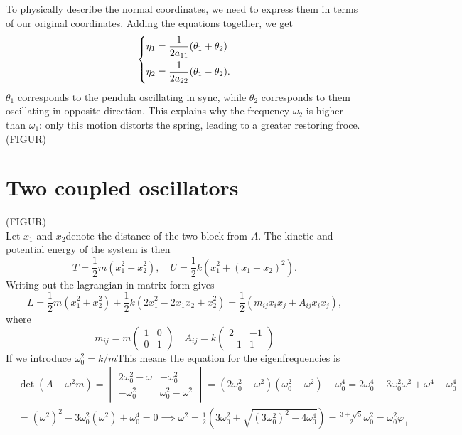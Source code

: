 \documentclass{article}
\begin{document}
    To physically describe the normal coordinates, we need to express them in terms of our original coordinates. Adding the equations together, we get
    \begin{equation*}
        \begin{dcases}
            \eta_1 = \frac{1}{2a_{11}}(\theta_1 + \theta_2) \\
            \eta_2 = \frac{1}{2a_{22}}(\theta_1 - \theta_2).
        \end{dcases}
    \end{equation*}
    $\theta_1$ corresponds to the pendula oscillating in sync, while $\theta_2$ corresponds to them oscillating in opposite direction. This explains why the frequency $\omega_2$ is higher than $\omega_1$: only this motion distorts the spring, leading to a greater restoring froce. (FIGUR)
    \section{Two coupled oscillators}
    (FIGUR) \\
    Let $x_1$ and $x_2$denote the distance of the two block from  $A$. The kinetic and potential energy of the system is then
    \begin{equation*}
        T = \frac{1}{2}m(\dot x_1^2 + \dot x_2^2), \quad U = \frac{1}{2} k (\dot x_1^2 + (x_1 - x_2)^2).
    \end{equation*}
    Writing out the lagrangian in matrix form gives
    \begin{equation*}
        L = \frac{1}{2}m(\dot x_1^2 + \dot x_2^2) + \frac{1}{2}k (2 \dot x_1^2 - 2 \dot x_1 \dot x_2 + \dot x_2^2) = \frac{1}{2}\left(m_{ij}\dot x_i \dot x_j + A_{ij} x_i x_j\right),
    \end{equation*}
    where
    \begin{equation*}
        m_{ij} = m
        \begin{pmatrix}
            1 & 0 \\
            0 & 1 
        \end{pmatrix}
        \quad A_{ij} = k
        \begin{pmatrix*}
            2 & -1 \\
            -1 & 1
        \end{pmatrix*}
    \end{equation*}
    If we introduce $\omega_0^2 = k/m$This means the equation for the eigenfrequencies is
    \begin{align*} & \det(A - \omega^2m) = 
        \begin{vmatrix}
            2\omega_0^2 - \omega& -\omega_0^2 \\
            -\omega_0^2 & \omega_0^2 - \omega^2
        \end{vmatrix}
        = (2\omega_0^2 - \omega^2)(\omega_0^2 - \omega^2) - \omega_0^4 = 2\omega_0^4 - 3 \omega_0^2\omega^2 + \omega^4 - \omega_0^4 \\
        & = (\omega^2)^2 - 3\omega_0^2(\omega^2) + \omega_0^4 =0 \implies \omega^2 = \frac{1}{2} \left(3\omega_0^2 \pm \sqrt{(3\omega_0^2)^2 - 4\omega_0^4}\right) = \frac{3 \pm \sqrt{5}}{2}\omega_0^2 = \omega_0^2 \varphi_\pm
    \end{align*}
\end{document}
